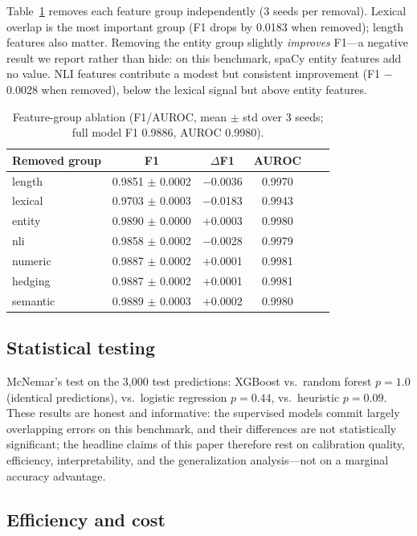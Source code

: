Table~\ref{tab:ablation} removes each feature group independently (3 seeds per removal). Lexical overlap is the most important group (F1 drops by 0.0183 when removed); length features also matter. Removing the entity group slightly \emph{improves} F1---a negative result we report rather than hide: on this benchmark, spaCy entity features add no value. NLI features contribute a modest but consistent improvement (F1 $-$0.0028 when removed), below the lexical signal but above entity features.

\begin{table}[t]
\centering
\small
\caption{Feature-group ablation (F1/AUROC, mean $\pm$ std over 3 seeds; full model F1 0.9886, AUROC 0.9980).}
\label{tab:ablation}
\begin{tabular}{@{}lccccc@{}}
\toprule
\textbf{Removed group} & \textbf{F1} & \textbf{$\Delta$F1} & \textbf{AUROC} \\
\midrule
length   & 0.9851 $\pm$ 0.0002 & $-$0.0036 & 0.9970 \\
lexical  & 0.9703 $\pm$ 0.0003 & $-$0.0183 & 0.9943 \\
entity   & 0.9890 $\pm$ 0.0000 & $+$0.0003 & 0.9980 \\
nli      & 0.9858 $\pm$ 0.0002 & $-$0.0028 & 0.9979 \\
numeric  & 0.9887 $\pm$ 0.0002 & $+$0.0001 & 0.9981 \\
hedging  & 0.9887 $\pm$ 0.0002 & $+$0.0001 & 0.9981 \\
semantic & 0.9889 $\pm$ 0.0003 & $+$0.0002 & 0.9980 \\
\bottomrule
\end{tabular}
\end{table}

\subsection{Statistical testing}

McNemar's test on the 3{,}000 test predictions: XGBoost vs.\ random forest $p=1.0$ (identical predictions), vs.\ logistic regression $p=0.44$, vs.\ heuristic $p=0.09$. These results are honest and informative: the supervised models commit largely overlapping errors on this benchmark, and their differences are not statistically significant; the headline claims of this paper therefore rest on calibration quality, efficiency, interpretability, and the generalization analysis---not on a marginal accuracy advantage.

\subsection{Efficiency and cost}

